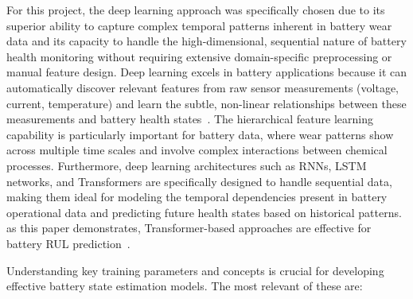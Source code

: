 For this project, the deep learning approach was specifically chosen due to its superior ability to capture complex temporal patterns inherent in battery wear data and its capacity to handle the high-dimensional, sequential nature of battery health monitoring without requiring extensive domain-specific preprocessing or manual feature design. Deep learning excels in battery applications because it can automatically discover relevant features from raw sensor measurements (voltage, current, temperature) and learn the subtle, non-linear relationships between these measurements and battery health states~\cite{noauthor_comprehensive_nodate}. The hierarchical feature learning capability is particularly important for battery data, where wear patterns show across multiple time scales and involve complex interactions between chemical processes. Furthermore, deep learning architectures such as RNNs, LSTM networks, and Transformers are specifically designed to handle sequential data, making them ideal for modeling the temporal dependencies present in battery operational data and predicting future health states based on historical patterns. as this paper demonstrates, Transformer-based approaches are effective for battery RUL prediction~\cite{chen_transformer_2022}.


Understanding key training parameters and concepts is crucial for developing effective battery state estimation models. The most relevant of these are:

